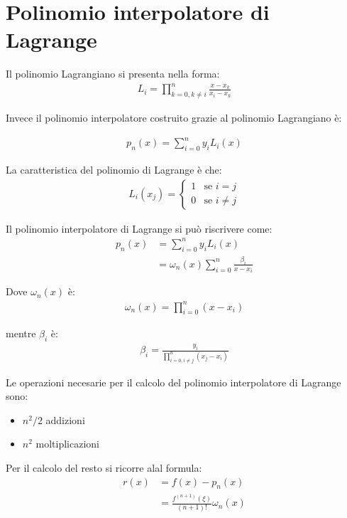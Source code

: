 \chapter{Polinomio interpolatore di Lagrange}

Il polinomio Lagrangiano si presenta nella forma:
\begin{align}
  L_i = \prod_{k=0, k\neq i}^n \frac{x - x_k}{x_i - x_k}
\end{align}

Invece il polinomio interpolatore costruito grazie al polinomio Lagrangiano è:

\begin{align}
  p_n(x) = \sum_{i=0}^n y_i L_i(x)
\end{align}

La caratteristica del polinomio di Lagrange è che:
\begin{align}
  L_i(x_j) = \begin{cases}
    1 & \text{se } i = j \\
    0 & \text{se } i \neq j
  \end{cases}
\end{align}

Il polinomio interpolatore di Lagrange si può riscrivere come:
\begin{align}
  p_n(x)  &= \sum_{i=0}^n y_i L_i(x) \\
          &= \omega_n(x) \sum_{i = 0}^n \frac{\beta_i}{x-x_i}
\end{align}

Dove $\omega_n(x)$ è:
\begin{align}
  \omega_n(x) = \prod_{i=0}^n (x-x_i)
\end{align}


mentre $\beta_i$ è:
\begin{align}
  \beta_i = \frac{y_i}{\prod_{i=0, i\neq j}^n (x_j - x_i)}
\end{align}

Le operazioni necesarie per il calcolo del polinomio interpolatore di Lagrange sono:

\begin{itemize}
  \item $n^2/2$ addizioni
  \item $n^2$ moltiplicazioni
\end{itemize}

Per il calcolo del resto si ricorre alal formula:
\begin{align}
  r(x) &= f(x) - p_n(x) \\
        &= \frac{f^{(n+1)}(\xi)}{(n+1)!} \omega_n(x)
\end{align}
